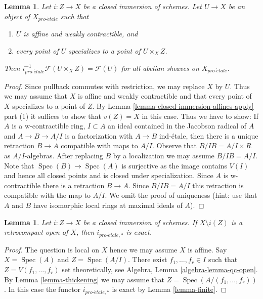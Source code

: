 \documentclass{stacks-project}
\theoremstyle{plain}
\newtheorem{lemma}[subsection]{Lemma}
\theoremstyle{definition}
\theoremstyle{remark}
\numberwithin{equation}{subsection}
\def\Spec{\mathop{\mathrm{Spec}}}
\def\proetale{{pro\text{-}\acute{e}tale}}
\begin{document}
\begin{lemma}
\label{lemma-compute-i-star}
Let $i : Z \to X$ be a closed immersion of schemes.
Let $U \to X$ be an object of $X_\proetale$ such that
\begin{enumerate}
\item $U$ is affine and weakly contractible, and
\item every point of $U$ specializes to a point of $U \times_X Z$.
\end{enumerate}
Then $i_\proetale^{-1}\mathcal{F}(U \times_X Z) = \mathcal{F}(U)$
for all abelian sheaves on $X_\proetale$.
\end{lemma}

\begin{proof}
Since pullback commutes with restriction, we may replace $X$ by $U$.
Thus we may assume that $X$ is affine and weakly contractible
and that every point of $X$ specializes to a point of $Z$.
By Lemma \ref{lemma-closed-immersion-affines-apply} part (1)
it suffices to show that $v(Z) = X$ in this case.
Thus we have to show: If $A$ is a w-contractible ring, $I \subset A$
an ideal contained in the Jacobson radical of $A$ and $A \to B \to A/I$
is a factorization with $A \to B$ ind-\'etale, then there is
a unique retraction $B \to A$ compatible with maps to $A/I$.
Observe that $B/IB = A/I \times R$ as $A/I$-algebras.
After replacing $B$ by a localization we may assume $B/IB = A/I$.
Note that $\Spec(B) \to \Spec(A)$ is surjective as the image
contains $V(I)$ and hence all closed points and is closed under
specialization. Since $A$ is w-contractible there is a retraction $B \to A$.
Since $B/IB = A/I$ this retraction is compatible with the map to $A/I$.
We omit the proof of uniqueness (hint: use that $A$ and $B$ have
isomorphic local rings at maximal ideals of $A$).
\end{proof}

\begin{lemma}
\label{lemma-closed-immersion-complement-retrocompact-exact}
Let $i : Z \to X$ be a closed immersion of schemes.
If $X \setminus i(Z)$ is a retrocompact open of $X$, then
$i_{\proetale, *}$ is exact.
\end{lemma}

\begin{proof}
The question is local on $X$ hence we may assume $X$ is affine.
Say $X = \Spec(A)$ and $Z = \Spec(A/I)$. There exist
$f_1, \ldots, f_r \in I$ such that $Z = V(f_1, \ldots, f_r)$
set theoretically, see Algebra, Lemma \ref{algebra-lemma-qc-open}.
By Lemma \ref{lemma-thickening} we may assume that
$Z = \Spec(A/(f_1, \ldots, f_r))$. In this case
the functor $i_{\proetale, *}$ is exact by
Lemma \ref{lemma-finite}.
\end{proof}
\end{document}
